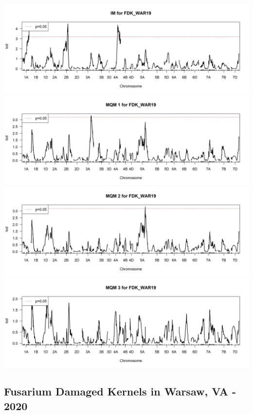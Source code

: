 \documentclass[
]{article}
\begin{document}
\includegraphics{Scan_IM_FDK_WAR19.jpg}
\includegraphics{Scan_MQM1_FDK_WAR19.jpg}
\includegraphics{Scan_MQM2_FDK_WAR19.jpg}
\includegraphics{Scan_MQM3_FDK_WAR19.jpg} \pagebreak

\subsection{Fusarium Damaged Kernels in Warsaw, VA -
2020}\label{fusarium-damaged-kernels-in-warsaw-va---2020}
\end{document}
